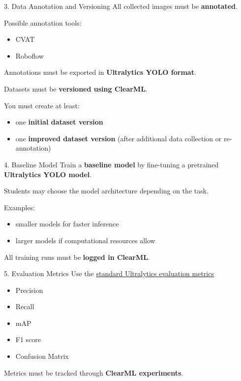 \documentclass[aspectratio=169]{beamer}
\begin{document}
\begin{frame}[t]{3. Data Annotation and Versioning}
All collected images must be \textbf{annotated}.

Possible annotation tools:
\begin{itemize}
\item CVAT
\item Roboflow
\end{itemize}

Annotations must be exported in \textbf{Ultralytics YOLO format}.

Datasets must be \textbf{versioned using ClearML}.

You must create at least:
\begin{itemize}
\item one \textbf{initial dataset version}
\item one \textbf{improved dataset version} (after additional data collection or re-annotation)
\end{itemize}
\end{frame}


\begin{frame}[t]{4. Baseline Model}
Train a \textbf{baseline model} by fine-tuning a pretrained
\textbf{Ultralytics YOLO model}.

Students may choose the model architecture depending on the task.

Examples:
\begin{itemize}
\item smaller models for faster inference
\item larger models if computational resources allow
\end{itemize}

All training runs must be \textbf{logged in ClearML}.
\end{frame}


\begin{frame}[t]{5. Evaluation Metrics}
Use the \href{https://docs.ultralytics.com/metrics/}{standard Ultralytics evaluation metrics}

\begin{itemize}
\item Precision
\item Recall
\item mAP
\item F1 score
\item Confusion Matrix
\end{itemize}

Metrics must be tracked through \textbf{ClearML experiments}.
\end{frame}
\end{document}
